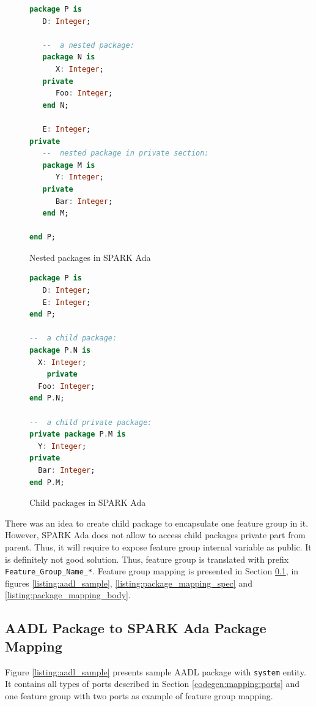\begin{figure}
\singlespacing
\begin{lstlisting}[language=ada, frame=single, gobble=0]
package P is
   D: Integer;

   --  a nested package:
   package N is
      X: Integer;
   private
      Foo: Integer;
   end N;

   E: Integer;
private
   --  nested package in private section:
   package M is
      Y: Integer;
   private
      Bar: Integer;
   end M;

end P;
\end{lstlisting}
\doublespacing
\caption{Nested packages in SPARK Ada}
\label{listing:nested_packages}
\end{figure}

\begin{figure}
\singlespacing
\begin{lstlisting}[language=ada, frame=single, gobble=0]
package P is
   D: Integer;
   E: Integer;
end P;

--  a child package:
package P.N is
  X: Integer;
	private
  Foo: Integer;
end P.N;

--  a child private package:
private package P.M is
  Y: Integer;
private
  Bar: Integer;
end P.M;
\end{lstlisting}
\doublespacing
\caption{Child packages in SPARK Ada}
\label{listing:child_packages}
\end{figure}

There was an idea to create child package to encapsulate one feature group in it. However, SPARK Ada does not allow to access child packages private part from parent. Thus, it will require to expose feature group internal variable as public. It is definitely not good solution. Thus, feature group is translated with prefix \lstinline{Feature_Group_Name_*}. Feature group mapping is presented in Section \ref{codegen:mapping:packages}, in figures \ref{listing:aadl_sample}, \ref{listing:package_mapping_spec} and \ref{listing:package_mapping_body}.


\subsection{AADL Package to SPARK Ada Package Mapping}
\label{codegen:mapping:packages}

Figure \ref{listing:aadl_sample} presents sample AADL package with \lstinline{system} entity. It contains all types of ports described in Section \ref{codegen:mapping:ports} and one feature group with two ports as example of feature group mapping.

